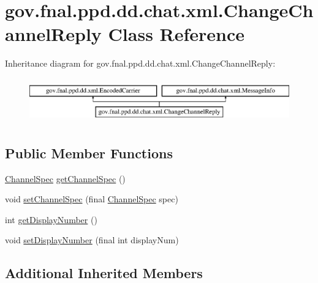 \hypertarget{classgov_1_1fnal_1_1ppd_1_1dd_1_1chat_1_1xml_1_1ChangeChannelReply}{\section{gov.\-fnal.\-ppd.\-dd.\-chat.\-xml.\-Change\-Channel\-Reply Class Reference}
\label{classgov_1_1fnal_1_1ppd_1_1dd_1_1chat_1_1xml_1_1ChangeChannelReply}
}
Inheritance diagram for gov.\-fnal.\-ppd.\-dd.\-chat.\-xml.\-Change\-Channel\-Reply\-:\begin{figure}[H]
\begin{center}
\leavevmode
\includegraphics[height=1.958042cm]{classgov_1_1fnal_1_1ppd_1_1dd_1_1chat_1_1xml_1_1ChangeChannelReply}
\end{center}
\end{figure}
\subsection*{Public Member Functions}
\begin{DoxyCompactItemize}
\item 
\hyperlink{classgov_1_1fnal_1_1ppd_1_1dd_1_1xml_1_1ChannelSpec}{Channel\-Spec} \hyperlink{classgov_1_1fnal_1_1ppd_1_1dd_1_1chat_1_1xml_1_1ChangeChannelReply_a60fbd9eeccc605782c347c552e114e36}{get\-Channel\-Spec} ()
\item 
void \hyperlink{classgov_1_1fnal_1_1ppd_1_1dd_1_1chat_1_1xml_1_1ChangeChannelReply_a3d1e0d62df0a0fcfef79f858af3f2eb6}{set\-Channel\-Spec} (final \hyperlink{classgov_1_1fnal_1_1ppd_1_1dd_1_1xml_1_1ChannelSpec}{Channel\-Spec} spec)
\item 
int \hyperlink{classgov_1_1fnal_1_1ppd_1_1dd_1_1chat_1_1xml_1_1ChangeChannelReply_aa25adb99414dfd6e065e905fd2d5e567}{get\-Display\-Number} ()
\item 
void \hyperlink{classgov_1_1fnal_1_1ppd_1_1dd_1_1chat_1_1xml_1_1ChangeChannelReply_a601a3bebc9c435e570a2ae04b9bf3107}{set\-Display\-Number} (final int display\-Num)
\end{DoxyCompactItemize}
\subsection*{Additional Inherited Members}


